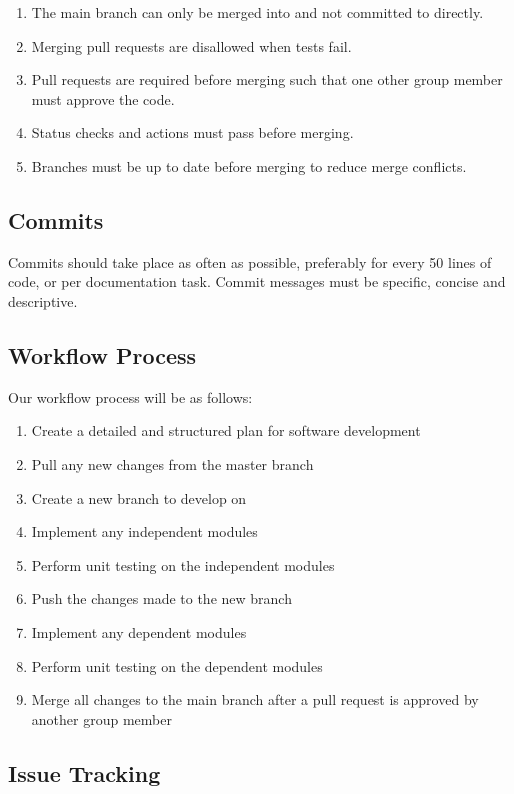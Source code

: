 \documentclass{article}
\begin{document}
\begin{enumerate}

\item The main branch can only be merged into and not committed to directly. 
\item Merging pull requests are disallowed when tests fail. 
\item Pull requests are required before merging such that one other group member must approve the code. 
\item Status checks and actions must pass before merging. 
\item Branches must be up to date before merging to reduce merge conflicts. 

\end{enumerate} 

\subsection{Commits}

Commits should take place as often as possible, preferably for every 50 lines of code, or per documentation task. Commit messages must be specific, concise and descriptive. 

\subsection{Workflow Process}

Our workflow process will be as follows:

\begin{enumerate}
\item Create a detailed and structured plan for software development
\item Pull any new changes from the master branch
\item Create a new branch to develop on
\item Implement any independent modules
\item Perform unit testing on the independent modules
\item Push the changes made to the new branch
\item Implement any dependent modules
\item Perform unit testing on the dependent modules
\item Merge all changes to the main branch after a pull request is approved by another group member
\end{enumerate}

\subsection{Issue Tracking}
\end{document}

